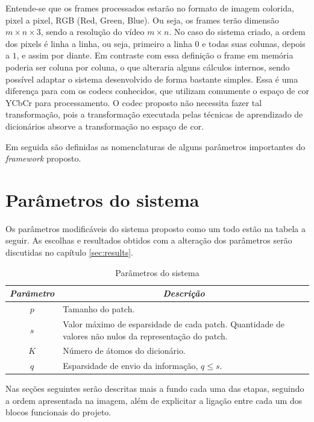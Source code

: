 \documentclass[cic,tc]{iiufrgs}
\begin{document}
Entende-se que os frames processados estarão no formato de imagem colorida,
pixel a pixel, RGB (Red, Green, Blue). 
Ou seja, os frames terão dimensão 
$m \times n \times 3$,
sendo a resolução do vídeo $m \times n$. 
No caso do sistema criado, a ordem dos pixels é 
linha a linha, ou seja, primeiro a linha $0$ e todas suas colunas, depois a $1$, e assim por diante.
Em contraste com essa definição o frame em memória poderia ser coluna por coluna, o que alteraria
alguns cálculos internos, sendo possível adaptar o sistema desenvolvido de forma bastante simples.
Essa é uma diferença para com os codecs conhecidos, que utilizam comumente o espaço de cor YCbCr
para processamento.
O codec proposto não necessita fazer tal transformação, pois a transformação executada pelas 
técnicas de aprendizado de dicionários absorve a transformação no espaço de cor.

Em seguida são definidas as nomenclaturas de alguns parâmetros importantes do
\textit{framework} proposto.

\section{Parâmetros do sistema}
Os parâmetros modificáveis do sistema proposto como um todo estão na tabela a seguir. 
As escolhas e resultados obtidos com a alteração dos parâmetros serão discutidas no 
capítulo \autoref{sec:results}.

\begin{table}[h]
    \caption{Parâmetros do sistema}
    \centering
        \begin{tabular}{|c|p{10cm}|}
          \hline
          \multicolumn{1}{|c|}{\textit{Parâmetro}} & 
            \multicolumn{1}{c|}{\textit{Descrição}}\\
          \hline
          \hline
          $p$    & Tamanho do patch. \\ 
          $s$    & Valor máximo de esparsidade de cada patch. Quantidade de valores não nulos da representação do patch. \\     
          $K$    & Número de átomos do dicionário. \\
          $q$    & Esparsidade de envio da informação, $q \le s$. \\
          \hline
        \end{tabular}
    \label{tbl:params}
\end{table}

Nas seções seguintes serão descritas mais a fundo cada uma das etapas, seguindo a ordem
apresentada na imagem, além de explicitar a ligação entre cada um dos blocos funcionais
do projeto.
\end{document}
